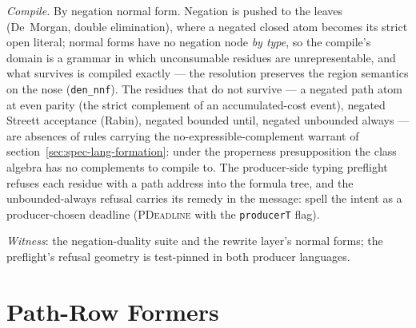 \emph{Compile.} By negation normal form. Negation is pushed to the
leaves (De~Morgan, double elimination), where a negated closed atom
becomes its strict open literal; normal forms have no negation node
\emph{by type}, so the compile's domain is a grammar in which
unconsumable residues are unrepresentable, and what survives is
compiled exactly --- the resolution preserves the region semantics
on the nose (\texttt{den\_nnf}). The residues that do not survive
--- a negated path atom at even parity (the strict complement of an
accumulated-cost event), negated Streett acceptance (Rabin), negated
bounded until, negated unbounded always --- are absences of rules
carrying the no-expressible-complement warrant of
section~\ref{sec:spec-lang-formation}: under the properness
presupposition the class algebra has no complements to compile to.
The producer-side typing preflight refuses each residue with a path
address into the formula tree, and the unbounded-always refusal
carries its remedy in the message: spell the intent as a
producer-chosen deadline (\textsc{PDeadline} with the
\texttt{producerT} flag).

\emph{Witness}: the negation-duality suite and the rewrite layer's
normal forms; the preflight's refusal geometry is test-pinned in
both producer languages.



\section{Path-Row Formers}
\label{sec:spec-lang-pathf}


